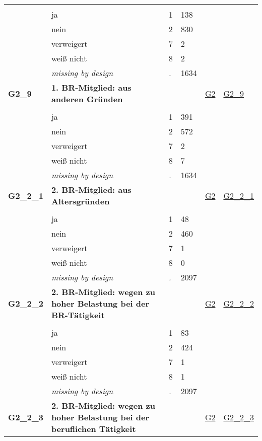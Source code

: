 \begin{longtable}{| L{2.45cm} | L{6cm} | C{1.5cm} | R{1cm} | C{2.25cm} | C{2.25cm} |}
   &  &  &  &  &  \\ 
   & ja & 1 & 138 &  &  \\ 
   & nein & 2 & 830 &  &  \\ 
   & verweigert & 7 & 2 &  &  \\ 
   & weiß nicht & 8 & 2 &  &  \\ 
   & \textit{missing by design} & \textit{.} & 1634 &  &  \\ 
   \midrule
\textbf{G2\_9}\label{var:G2:9} & \textbf{1. BR-Mitglied: aus anderen Gründen} &  &  & \hyperref[G2]{G2} & \hyperref[var:suf:G2:9]{G2\_9} \\ 
   &  &  &  &  &  \\ 
   & ja & 1 & 391 &  &  \\ 
   & nein & 2 & 572 &  &  \\ 
   & verweigert & 7 & 2 &  &  \\ 
   & weiß nicht & 8 & 7 &  &  \\ 
   & \textit{missing by design} & \textit{.} & 1634 &  &  \\ 
   \midrule
\textbf{G2\_2\_1}\label{var:G2:2:1} & \textbf{2. BR-Mitglied: aus Altersgründen} &  &  & \hyperref[G2]{G2} & \hyperref[var:suf:G2:2:1]{G2\_2\_1} \\ 
   &  &  &  &  &  \\ 
   & ja & 1 & 48 &  &  \\ 
   & nein & 2 & 460 &  &  \\ 
   & verweigert & 7 & 1 &  &  \\ 
   & weiß nicht & 8 & 0 &  &  \\ 
   & \textit{missing by design} & \textit{.} & 2097 &  &  \\ 
   \midrule
\textbf{G2\_2\_2}\label{var:G2:2:2} & \textbf{2. BR-Mitglied: wegen zu hoher Belastung bei der BR-Tätigkeit} &  &  & \hyperref[G2]{G2} & \hyperref[var:suf:G2:2:2]{G2\_2\_2} \\ 
   &  &  &  &  &  \\ 
   & ja & 1 & 83 &  &  \\ 
   & nein & 2 & 424 &  &  \\ 
   & verweigert & 7 & 1 &  &  \\ 
   & weiß nicht & 8 & 1 &  &  \\ 
   & \textit{missing by design} & \textit{.} & 2097 &  &  \\ 
   \midrule
\textbf{G2\_2\_3}\label{var:G2:2:3} & \textbf{2. BR-Mitglied: wegen zu hoher Belastung bei der beruflichen Tätigkeit} &  &  & \hyperref[G2]{G2} & \hyperref[var:suf:G2:2:3]{G2\_2\_3} \\ 

\end{longtable}
